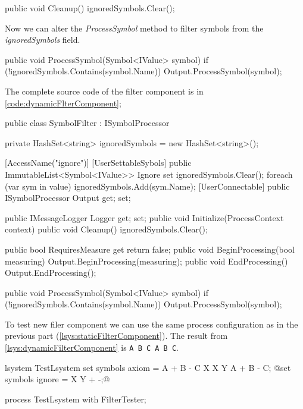 \begin{Csharp}
public void Cleanup() {
	ignoredSymbols.Clear();
}
\end{Csharp}

Now we can alter the \emph{ProcessSymbol} method to filter symbols from the \emph{ignoredSymbols} field.

\begin{Csharp}
public void ProcessSymbol(Symbol<IValue> symbol) {
	if (!ignoredSymbols.Contains(symbol.Name)) {
		Output.ProcessSymbol(symbol);
	}
}
\end{Csharp}

The complete source code of the filter component is in \autoref{code:dynamicFlterComponent};


\begin{CsharpBreak}[label=code:dynamicFlterComponent,caption={Filter component with static filtering}]
public class SymbolFilter : ISymbolProcessor {

	private HashSet<string> ignoredSymbols = new HashSet<string>();

	[AccessName("ignore")]
	[UserSettableSybols]
	public ImmutableList<Symbol<IValue>> Ignore {
		set {
			ignoredSymbols.Clear();
			foreach (var sym in value) {
				ignoredSymbols.Add(sym.Name);
			}
		}
	}
	[UserConnectable]
	public ISymbolProcessor Output { get; set; }

	public IMessageLogger Logger { get; set; }
	public void Initialize(ProcessContext context) { }
	public void Cleanup() {
		ignoredSymbols.Clear();
	}
	
	public bool RequiresMeasure { get { return false; } }
	public void BeginProcessing(bool measuring) {
		Output.BeginProcessing(measuring);
	}
	public void EndProcessing() {
		Output.EndProcessing();
	}
	
	public void ProcessSymbol(Symbol<IValue> symbol) {
		if (!ignoredSymbols.Contains(symbol.Name)) {
			Output.ProcessSymbol(symbol);
		}
	}
}
\end{CsharpBreak}

To test new filer component we can use the same process configuration as in the previous part (\autoref{lsys:staticFilterComponent}).
The result from \autoref{lsys:dynamicFilterComponent} is \texttt{A B C A B C}.

\begin{Lsystem}[label=lsys:dynamicFilterComponent,caption={\lsystem code for testing improved filter component}]
lsystem TestLsystem {
	set symbols axiom = A + B - C X X Y A + B - C;
	@set symbols ignore = X Y + -;@
}

process TestLsystem with FilterTester;
\end{Lsystem}


